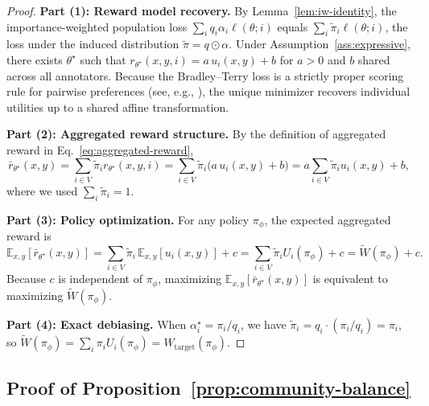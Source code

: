 \documentclass{article}
\theoremstyle{plain}
\theoremstyle{definition}
\theoremstyle{remark}
\begin{document}
\begin{proof}
\textbf{Part (1): Reward model recovery.}
By Lemma~\ref{lem:iw-identity}, the importance-weighted population loss
$\sum_i q_i \alpha_i \ell(\theta; i)$ equals $\sum_i \tilde\pi_i \ell(\theta; i)$,
the loss under the induced distribution $\tilde\pi = q \odot \alpha$.
Under Assumption~\ref{ass:expressive}, there exists $\theta^\star$ such that
$r_{\theta^\star}(x,y,i) = a \, u_i(x,y) + b$ for $a > 0$ and $b$ shared across
all annotators.
Because the Bradley--Terry loss is a strictly proper scoring rule for pairwise
preferences (see, e.g., \citealt{gneiting2007strictly}), the unique minimizer
recovers individual utilities up to a shared affine transformation.

\textbf{Part (2): Aggregated reward structure.}
By the definition of aggregated reward in Eq.~\eqref{eq:aggregated-reward},
\begin{equation}
    \bar r_{\theta^\star}(x,y)
    =
    \sum_{i \in V} \tilde\pi_i r_{\theta^\star}(x,y,i)
    =
    \sum_{i \in V} \tilde\pi_i \big(a \, u_i(x,y) + b\big)
    =
    a \sum_{i \in V} \tilde\pi_i u_i(x,y) + b,
\end{equation}
where we used $\sum_i \tilde\pi_i = 1$.

\textbf{Part (3): Policy optimization.}
For any policy $\pi_\phi$, the expected aggregated reward is
\begin{equation}
    \mathbb{E}_{x,y}[\bar r_{\theta^\star}(x,y)]
    =
    \sum_{i \in V} \tilde\pi_i \, \mathbb{E}_{x,y}[u_i(x,y)] + c
    =
    \sum_{i \in V} \tilde\pi_i U_i(\pi_\phi) + c
    =
    \widetilde{W}(\pi_\phi) + c.
\end{equation}
Because $c$ is independent of $\pi_\phi$, maximizing
$\mathbb{E}_{x,y}[\bar r_{\theta^\star}(x,y)]$ is equivalent to maximizing
$\widetilde{W}(\pi_\phi)$.

\textbf{Part (4): Exact debiasing.}
When $\alpha_i^\star = \pi_i / q_i$, we have
$\tilde\pi_i = q_i \cdot (\pi_i / q_i) = \pi_i$, so
$\widetilde{W}(\pi_\phi) = \sum_i \pi_i U_i(\pi_\phi) = W_{\text{target}}(\pi_\phi)$.
\end{proof}

\subsection{Proof of Proposition~\ref{prop:community-balance}}
\label{app:proof-community}
\end{document}
